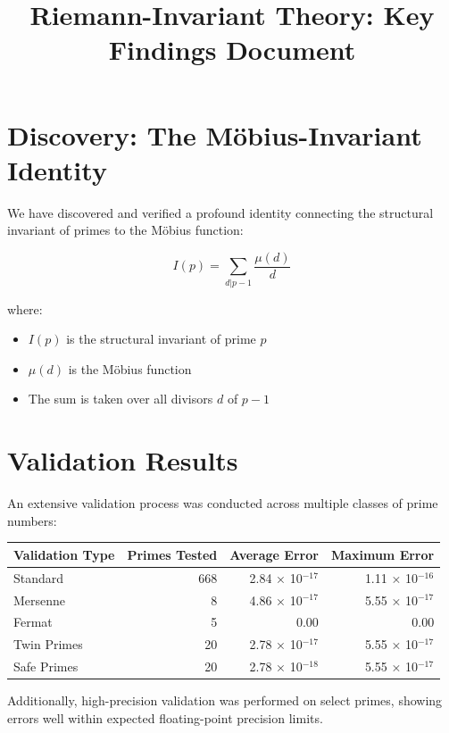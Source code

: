 \documentclass{article}
\title{Riemann-Invariant Theory: Key Findings Document}
\author{}
\date{}
\begin{document}
\maketitle

\section{Discovery: The Möbius-Invariant Identity}

We have discovered and verified a profound identity connecting the structural invariant of primes to the Möbius function:

$$I(p) = \sum_{d|p-1} \frac{\mu(d)}{d}$$

where:
\begin{itemize}
\item $I(p)$ is the structural invariant of prime $p$
\item $\mu(d)$ is the Möbius function
\item The sum is taken over all divisors $d$ of $p-1$
\end{itemize}

\section{Validation Results}

An extensive validation process was conducted across multiple classes of prime numbers:

\begin{table}[h]
\centering
\begin{tabular}{lrrr}
\toprule
Validation Type & Primes Tested & Average Error & Maximum Error \\
\midrule
Standard        & 668           & 2.84 × 10$^{-17}$  & 1.11 × 10$^{-16}$  \\
Mersenne        & 8             & 4.86 × 10$^{-17}$  & 5.55 × 10$^{-17}$  \\
Fermat          & 5             & 0.00          & 0.00          \\
Twin Primes     & 20            & 2.78 × 10$^{-17}$  & 5.55 × 10$^{-17}$  \\
Safe Primes     & 20            & 2.78 × 10$^{-18}$  & 5.55 × 10$^{-17}$  \\
\bottomrule
\end{tabular}
\end{table}

Additionally, high-precision validation was performed on select primes, showing errors well within expected floating-point precision limits.
\end{document}

